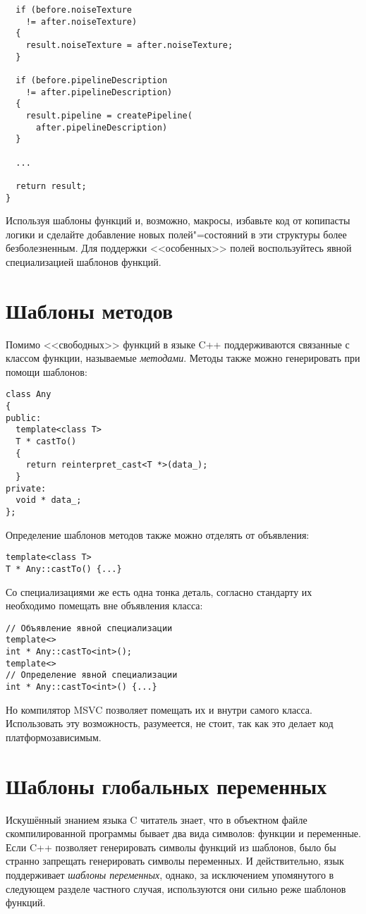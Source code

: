 \begin{enumerate}
\begin{verbatim}
  if (before.noiseTexture
    != after.noiseTexture)
  {
    result.noiseTexture = after.noiseTexture;
  }

  if (before.pipelineDescription
    != after.pipelineDescription)
  {
    result.pipeline = createPipeline(
      after.pipelineDescription)
  }

  ...

  return result;
}
\end{verbatim}
Используя шаблоны функций и, возможно, макросы, избавьте код от копипасты логики и сделайте добавление новых полей"=состояний в эти структуры более безболезненным.
Для поддержки <<особенных>> полей воспользуйтесь явной специализацией шаблонов функций.
\end{enumerate}

\section{Шаблоны методов}
Помимо <<свободных>> функций в языке C++ поддерживаются связанные с классом функции, называемые \textit{методами}.
Методы также можно генерировать при помощи шаблонов:
\begin{verbatim}
class Any
{
public:
  template<class T>
  T * castTo()
  {
    return reinterpret_cast<T *>(data_);
  }
private:
  void * data_;
};
\end{verbatim}
Определение шаблонов методов также можно отделять от объявления:
\begin{verbatim}
template<class T>
T * Any::castTo() {...}
\end{verbatim}
Со специализациями же есть одна тонка деталь, согласно стандарту их необходимо помещать вне объявления класса:
\begin{verbatim}
// Объявление явной специализации
template<>
int * Any::castTo<int>();
template<>
// Определение явной специализации
int * Any::castTo<int>() {...}
\end{verbatim}
Но компилятор MSVC позволяет помещать их и внутри самого класса.
Использовать эту возможность, разумеется, не стоит, так как это делает код платформозависимым.

\section{Шаблоны глобальных переменных}

Искушённый знанием языка C читатель знает, что в объектном файле скомпилированной программы бывает два вида символов: функции и переменные.
Если C++ позволяет генерировать символы функций из шаблонов, было бы странно запрещать генерировать символы переменных.
И действительно, язык поддерживает \textit{шаблоны переменных}, однако, за исключением упомянутого в следующем разделе частного случая, используются они сильно реже шаблонов функций.

